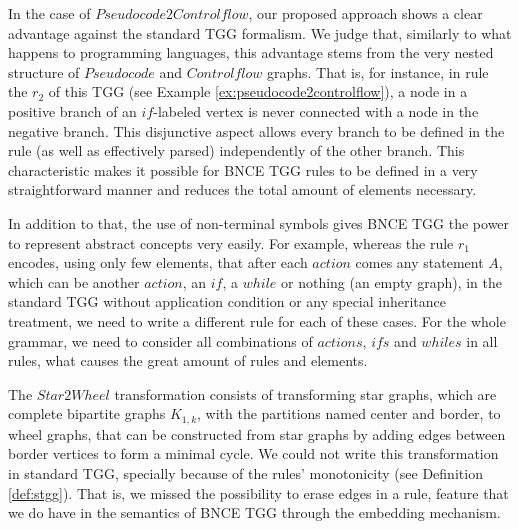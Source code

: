 In the case of $Pseudocode2Controlflow$, our proposed approach shows a clear advantage against the standard TGG formalism. We judge that, similarly to what happens to programming languages, this advantage stems from the very nested structure of $Pseudocode$ and $Controlflow$ graphs. That is, for instance, in rule the $r_2$ of this TGG (see Example \ref{ex:pseudocode2controlflow}), a node in a positive branch of an $if$-labeled vertex is never connected with a node in the negative branch. This disjunctive aspect allows every branch to be defined in the rule (as well as effectively parsed) independently of the other branch. This characteristic makes it possible for BNCE TGG rules to be defined in a very straightforward manner and reduces the total amount of elements necessary.

In addition to that, the use of non-terminal symbols gives BNCE TGG the power to represent abstract concepts very easily. For example, whereas the rule $r_1$ encodes, using only few elements, that after each $action$ comes any statement $A$, which can be another $action$, an $if$, a $while$ or nothing (an empty graph), in the standard TGG without application condition or any special inheritance treatment, we need to write a different rule for each of these cases. For the whole grammar, we need to consider all combinations of $actions$, $ifs$ and $whiles$ in all rules, what causes the great amount of rules and elements.

The $Star2Wheel$ transformation consists of transforming star graphs, which are complete bipartite graphs $K_{1,k}$, with the partitions named center and border, to wheel graphs, that can be constructed from star graphs by adding edges between border vertices to form a minimal cycle. We could not write this transformation in standard TGG, specially because of the rules' monotonicity (see Definition \ref{def:stgg}). That is, we missed the possibility to erase edges in a rule, feature that we do have in the semantics of BNCE TGG through the embedding mechanism.




